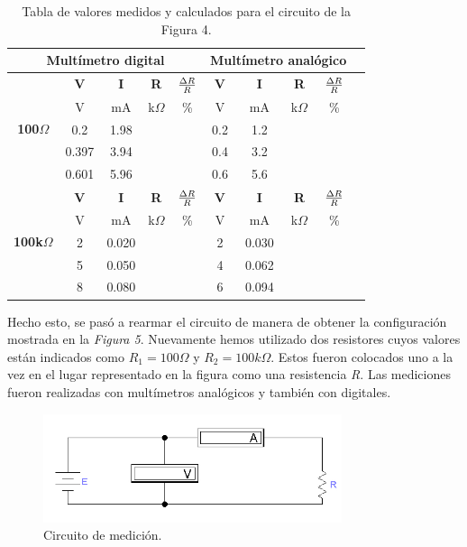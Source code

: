 \documentclass{article}
\begin{document}
\begin{table}[!hbt]
	\begin{center}

		\begin{tabular}{|c|c|c|c|c|c|c|c|c|c|} \hline
			\multicolumn{5}{|c|}{\textbf{Multímetro digital}} & \multicolumn{4}{|c|}{\textbf{Multímetro analógico}} \\ \hline
			\multirow{5}{*}{\textbf{100$\Omega$}} 
			& \textbf{V} & \textbf{I} & \textbf{R} & \textbf{${\Delta R \over R}$} & \textbf{V} & \textbf{I} & \textbf{R} & \textbf{${\Delta R \over R}$} \\\cline{2-9}
			& V & mA & k$\Omega$ & \% & V & mA & k$\Omega$ & \% \\\cline{2-9}
			& 0.2 & 1.98 &  &  & 0.2 & 1.2 &  &  \\\cline{2-9}
			& 0.397 & 3.94 &  &  & 0.4 & 3.2 &  &  \\\cline{2-9}
			& 0.601 & 5.96 &  &  & 0.6 & 5.6 &  &  \\ \hline
			\multirow{5}{*}{\textbf{100k$\Omega$}} 
			& \textbf{V} & \textbf{I} & \textbf{R} & \textbf{${\Delta R \over R}$} & \textbf{V} & \textbf{I} & \textbf{R} & \textbf{${\Delta R \over R}$} \\\cline{2-9}
			& V & mA & k$\Omega$ & \% & V & mA & k$\Omega$ & \% \\\cline{2-9}
			& 2 & 0.020 &  &  & 2 & 0.030 &  &  \\\cline{2-9}
			& 5 & 0.050 &  &  & 4 & 0.062 &  &  \\\cline{2-9}
			& 8 & 0.080 &  &  & 6 & 0.094 &  &  \\ \hline
		\end{tabular}

	\caption{Tabla de valores medidos y calculados para el circuito de la Figura 4.}
	\end{center}
\end{table}
\bigskip



	Hecho esto, se pasó a rearmar el circuito de manera de obtener la configuración mostrada en la \textit{Figura 5}. Nuevamente hemos utilizado dos resistores cuyos valores están indicados como \textit{$R_1=100\Omega$} y \textit{$R_2=100k\Omega$}. Estos fueron colocados uno a la vez en el lugar representado en la figura como una resistencia \textit{R}. Las mediciones fueron realizadas con multímetros analógicos y también con digitales.
\bigskip


\begin{figure}[h]
	\centering
	\includegraphics[width=0.78\textwidth]{images/p2-item-b.jpg}
	\caption{Circuito de medición.}
\end{figure}
\bigskip\bigskip
\end{document}
